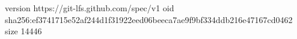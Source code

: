 version https://git-lfs.github.com/spec/v1
oid sha256:ef3741715e52af244d1f31922eed06beeca7ae9f9bf334ddb216e47167cd0462
size 14446
